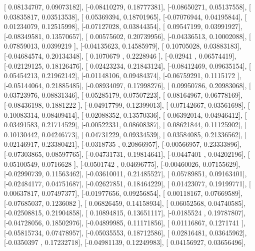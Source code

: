 \documentclass{article}
\begin{document}
       [ 0.08134707,  0.09073182],
       [-0.08410279,  0.18777381],
       [-0.08650271,  0.05137558],
       [ 0.03835817,  0.03513538],
       [ 0.05369394,  0.18701965],
       [-0.07076944,  0.04195844],
       [ 0.01234079,  0.12515998],
       [-0.07127028,  0.03844354],
       [ 0.09547199,  0.03991927],
       [-0.08349581,  0.13570657],
       [ 0.00575602,  0.20739956],
       [-0.04336513,  0.10002088],
       [ 0.07859013,  0.0399219 ],
       [-0.04135623,  0.14585979],
       [ 0.10705028,  0.03883183],
       [-0.04684574,  0.20134348],
       [ 0.1070679 ,  0.2228946 ],
       [-0.02941   ,  0.06574419],
       [-0.02129125,  0.18126476],
       [ 0.02423234,  0.21843124],
       [-0.08412469,  0.09635154],
       [ 0.05454213,  0.21962142],
       [-0.01148106,  0.09484374],
       [-0.06759291,  0.1115172 ],
       [-0.05144064,  0.21885485],
       [-0.08934097,  0.17998276],
       [ 0.09950786,  0.20983068],
       [ 0.03723976,  0.08831346],
       [ 0.05285179,  0.07507223],
       [ 0.08164967,  0.06778169],
       [-0.08436198,  0.1881222 ],
       [-0.04917799,  0.12399013],
       [ 0.07142667,  0.03561698],
       [ 0.10083314,  0.08409414],
       [ 0.02088352,  0.13570336],
       [ 0.06392014,  0.04946412],
       [ 0.03491583,  0.21714529],
       [-0.00522331,  0.08608387],
       [ 0.08621844,  0.11125902],
       [ 0.10130442,  0.04246773],
       [ 0.04731229,  0.09334539],
       [ 0.03584085,  0.21336562],
       [ 0.02146917,  0.23380421],
       [-0.0318735 ,  0.20866957],
       [-0.00566957,  0.23333896],
       [-0.07303865,  0.08597765],
       [-0.04731731,  0.19814641],
       [-0.0447401 ,  0.04202196],
       [ 0.05100549,  0.0716628 ],
       [-0.0501742 ,  0.04696775],
       [-0.00460026,  0.07155629],
       [-0.02990739,  0.11563462],
       [-0.03610011,  0.21485527],
       [ 0.05789851,  0.09163401],
       [-0.02484177,  0.04751687],
       [-0.02627851,  0.18464229],
       [ 0.01423077,  0.19199771],
       [ 0.00637817,  0.07497377],
       [-0.01977656,  0.09256854],
       [ 0.00118167,  0.07669589],
       [-0.07685037,  0.1236082 ],
       [ 0.06826459,  0.14158934],
       [ 0.06052568,  0.04740585],
       [-0.02508815,  0.21904858],
       [ 0.10894815,  0.13651117],
       [-0.0185524 ,  0.19787807],
       [-0.04728056,  0.18502976],
       [-0.04899985,  0.11171856],
       [ 0.01116867,  0.1271741 ],
       [-0.05815734,  0.07478957],
       [-0.05035553,  0.18712586],
       [ 0.02816481,  0.03645962],
       [-0.0350397 ,  0.17232718],
       [-0.04981139,  0.12249983],
       [ 0.04156927,  0.03656496],
\end{document}
